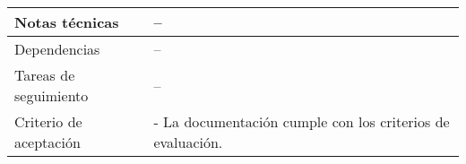 \begin{table}[H]
\begin{adjustbox}{max width=\textwidth}
\begin{tabularx}{\textwidth}{|l|L|}
        Notas técnicas & – \\ \hline
        Dependencias & – \\ \hline
        Tareas de seguimiento & – \\ \hline
        Criterio de aceptación & - La documentación cumple con los criterios de evaluación. \\ \hline
    \end{tabularx}
    \end{adjustbox}
\end{table}

